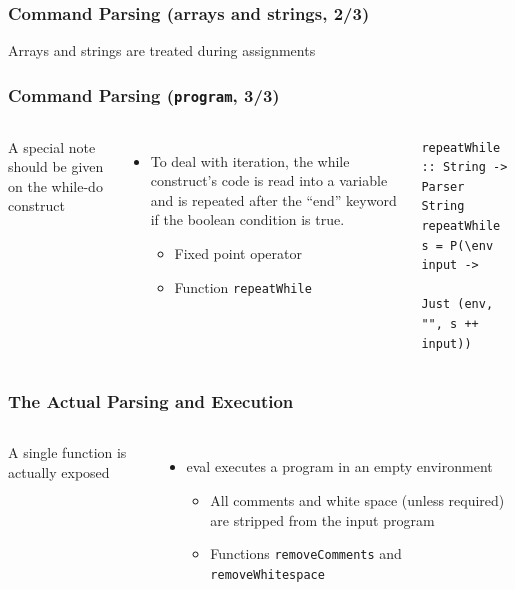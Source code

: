 \documentclass{beamer}
\begin{document}
\begin{frame}
	\frametitle{Command Parsing (arrays and strings, 2/3)}
	\centerline{\small Arrays and strings are treated during assignments}
	
\end{frame}

\begin{frame}[fragile]
	\frametitle{Command Parsing (\texttt{program}, 3/3)}
	\begin{columns}
		\small
		A special note should be given on the while-do construct
		\begin{itemize}
			\small
			\item To deal with iteration, the while construct’s code is read
				into a variable and is repeated after the “end” keyword if the
				boolean condition is true.
			\begin{itemize}
				\footnotesize
				\item Fixed point operator
				\item Function \texttt{repeatWhile}
			\end{itemize}
		\end{itemize}
		
\begin{lstlisting}[basicstyle=\ttfamily\tiny]
repeatWhile :: String -> Parser String
repeatWhile s = P(\env input ->
                  Just (env, "", s ++ input))
\end{lstlisting}
	\end{columns}
\end{frame}


\begin{frame}[fragile]
	\frametitle{The Actual Parsing and Execution}
	\begin{columns}
		\column{0.35\textwidth}
		\small
		A single function is actually exposed
		\begin{itemize}
			\small
		\item eval executes a program in an empty environment
			\begin{itemize}
				\footnotesize
				\item All comments and white space (unless required) are
					stripped from the input program
				\item Functions \texttt{removeComments} and
					\texttt{removeWhitespace}
			\end{itemize}
		\end{itemize}
		\column{0.6\textwidth}
		
	\end{columns}
\end{frame}
\end{document}
